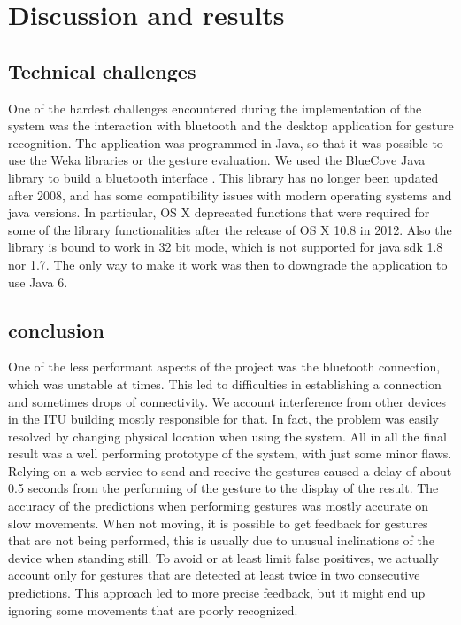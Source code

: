 \section{Discussion and results}

\subsection{Technical challenges}
One of the hardest challenges encountered during the implementation of the system was the interaction with bluetooth and the desktop application for gesture recognition.
The application was programmed in Java, so that it was possible to use the Weka libraries or the gesture evaluation.
We used the BlueCove Java library to build a bluetooth interface \cite{bluecove} .
This library has no longer been updated after 2008, and has some compatibility issues with modern operating systems and java versions.
In particular, OS X deprecated functions that were required for some of the library functionalities after the release of OS X 10.8 in 2012.
Also the library is bound to work in 32 bit mode, which is not supported for java sdk 1.8 nor 1.7.
The only way to make it work was then to downgrade the application to use Java 6.

\subsection{conclusion}

One of the less performant aspects of the project was the bluetooth connection, which was unstable at times. 
This led to difficulties in establishing a connection and sometimes drops of connectivity.
We account interference from other devices in the ITU building mostly responsible for that. 
In fact, the problem was easily resolved by changing physical location when using the system.
All in all the final result was a well performing prototype of the system, with just some minor flaws.
Relying on a web service to send and receive the gestures caused a delay of about 0.5 seconds from the performing of the gesture to the display of the result.
The accuracy of the predictions when performing gestures was mostly accurate on slow movements. When not moving, it is possible to get feedback for gestures that are not being performed, this is usually due to unusual inclinations of the device when standing still.
To avoid or at least limit false positives, we actually account only for gestures that are detected at least twice in two consecutive predictions. 
This approach led to more precise feedback, but it might end up ignoring some movements that are poorly recognized.
